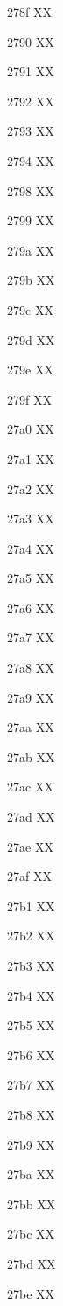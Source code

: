 \documentclass[11pt]{article}
\begin{document}
278f X{}X

2790 X{}X

2791 X{}X

2792 X{}X

2793 X{}X

2794 X{}X

2798 X{}X

2799 X{}X

279a X{}X

279b X{}X

279c X{}X

279d X{}X

279e X{}X

279f X{}X

27a0 X{}X

27a1 X{}X

27a2 X{}X

27a3 X{}X

27a4 X{}X

27a5 X{}X

27a6 X{}X

27a7 X{}X

27a8 X{}X

27a9 X{}X

27aa X{}X

27ab X{}X

27ac X{}X

27ad X{}X

27ae X{}X

27af X{}X

27b1 X{}X

27b2 X{}X

27b3 X{}X

27b4 X{}X

27b5 X{}X

27b6 X{}X

27b7 X{}X

27b8 X{}X

27b9 X{}X

27ba X{}X

27bb X{}X

27bc X{}X

27bd X{}X

27be X{}X
\end{document}
